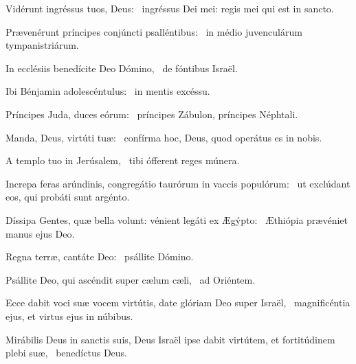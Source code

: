 
\item Vidérunt ingréssus tuos, Deus:~\psstar{} ingréssus Dei mei: regis mei qui est in sancto.

\item Prævenérunt príncipes conjúncti psalléntibus:~\psstar{} in médio juvenculárum tympanistriárum.

\item In ecclésiis benedícite Deo Dómino,~\psstar{} de fóntibus Israël.

\item Ibi Bénjamin adolescéntulus:~\psstar{} in mentis excéssu.

\item Príncipes Juda, duces eórum:~\psstar{} príncipes Zábulon, príncipes Néphtali.

\item Manda, Deus, virtúti tuæ:~\psstar{} confírma hoc, Deus, quod operátus es in nobis.

\item A templo tuo in Jerúsalem,~\psstar{} tibi ófferent reges múnera.

\item Increpa feras arúndinis, congregátio taurórum in vaccis populórum:~\psstar{} ut exclúdant eos, qui probáti sunt argénto.

\item Díssipa Gentes, quæ bella volunt: vénient legáti ex Ægýpto:~\psstar{} Æthiópia prævéniet manus ejus Deo.

\item Regna terræ, cantáte Deo:~\psstar{} psállite Dómino.

\item Psállite Deo, qui ascéndit super cælum cæli,~\psstar{} ad Oriéntem.

\item Ecce dabit voci suæ vocem virtútis, date glóriam Deo super Israël,~\psstar{} magnificéntia ejus, et virtus ejus in núbibus.

\item Mirábilis Deus in sanctis suis, Deus Israël ipse dabit virtútem, et fortitúdinem plebi suæ,~\psstar{} benedíctus Deus.
